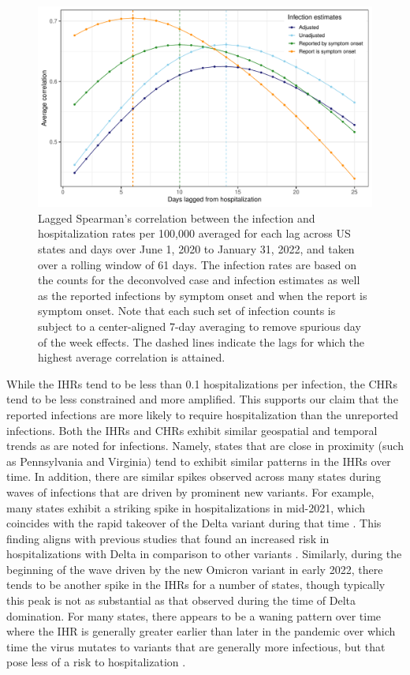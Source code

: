 \documentclass{article}
\begin{document}
\begin{figure}[!tb]
\centering
    \includegraphics[width=.8\textwidth]{adj_unadj_sym_inc_hosp_lag_corr_Nov2.pdf} 
    \caption{Lagged Spearman's correlation between the infection and
    hospitalization rates per 100,000 averaged for each lag across US states
    and days over June 1, 2020 to January 31, 2022, and taken over a rolling
    window of 61 days. The infection rates are based on the counts for the
    deconvolved case and infection estimates as well as the reported infections
    by symptom onset and when the report is symptom onset. Note that each such
    set of infection counts is subject to a center-aligned 7-day averaging to
    remove spurious day of the week effects. The dashed lines indicate the lags
    for which the highest average correlation is attained.}
    \label{fig:adj_unadj_sym_hosp_lag_corr}
\end{figure}
While the IHRs tend to be less than 0.1 hospitalizations per infection, the CHRs tend to be less constrained and
more amplified. This supports our claim that the reported infections are more likely to require hospitalization
than the unreported infections. Both the IHRs and CHRs exhibit similar geospatial and 
temporal trends as are noted for infections. 
Namely, states that are close in proximity (such as Pennsylvania and Virginia) tend to exhibit similar patterns in
the IHRs over time. In addition, there are similar spikes observed across many states during 
waves of infections that are driven by prominent new variants. For example, many
states exhibit a striking spike in hospitalizations in mid-2021, which coincides with the rapid takeover 
of the Delta variant during that time \citep{hodcroft2021covariants}. This finding aligns with 
previous studies that found an increased risk in hospitalizations with Delta in comparison to other
variants \citep{twohig2022hospital, nyberg2022comparative}. Similarly, during the beginning of the
wave driven by the new Omicron variant in early 2022, there tends to be another spike in the IHRs
for a number of states, though typically this peak is not as substantial as that observed during the
time of Delta domination. For many states, there appears to be a waning pattern over time where the
IHR is generally greater earlier than later in the pandemic over which time the virus mutates to variants that 
are generally more infectious, but that pose less of a risk to 
hospitalization \citep{lorenzo2022covid, blauer2022compare}.
\end{document}
